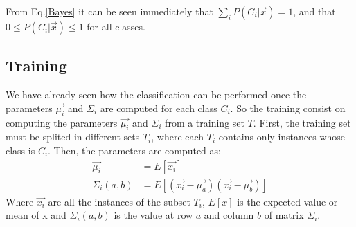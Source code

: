 \documentclass[10pt,journal]{IEEEtran}
\begin{document}
	From Eq.\eqref{Bayes} it can be seen immediately that $\sum_i{P(C_i|\vec{x})}=1$, and that $0 \le P(C_i|\vec{x}) \le 1$
	for all classes.
	
	\subsection{Training}
	We have already seen how the classification can be performed once the parameters $\vec{\mu_i}$ and $\Sigma_i$ are
	computed for each class $C_i$. So the training consist on computing the parameters $\vec{\mu_i}$ and $\Sigma_i$ from
	a training set $T$. First, the training set must be splited in different sets $T_i$, where each $T_i$ contains only
	instances whose class is $C_i$. Then, the parameters are computed as:
	\begin{equation}\label{multiParams}
	\begin{aligned}
		\vec{\mu_i} &= E[ \vec{x_i} ] \\
		\Sigma_i(a,b) &= E[ (\vec{x_i}-\vec{\mu_a})(\vec{x_i}-\vec{\mu_b}) ]
	\end{aligned}
	\end{equation}
	Where $\vec{x_i}$ are all the instances of the subset $T_i$, $E[x]$ is the expected value or mean of x and
	$\Sigma_i(a,b)$ is the value at row $a$ and column $b$ of matrix $\Sigma_i$.
	
\end{document}
